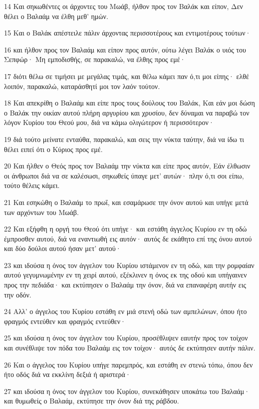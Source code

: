 \par 14 Και σηκωθέντες οι άρχοντες του Μωάβ, ήλθον προς τον Βαλάκ και είπον, Δεν θέλει ο Βαλαάμ να έλθη μεθ' ημών.
\par 15 Και ο Βαλάκ απέστειλε πάλιν άρχοντας περισσοτέρους και εντιμοτέρους τούτων·
\par 16 και ήλθον προς τον Βαλαάμ και είπον προς αυτόν, ούτω λέγει Βαλάκ ο υιός του Σεπφώρ· Μη εμποδισθής, σε παρακαλώ, να έλθης προς εμέ·
\par 17 διότι θέλω σε τιμήσει με μεγάλας τιμάς, και θέλω κάμει παν ό,τι μοι είπης· ελθέ λοιπόν, παρακαλώ, καταράσθητί μοι τον λαόν τούτον.
\par 18 Και απεκρίθη ο Βαλαάμ και είπε προς τους δούλους του Βαλάκ, Και εάν μοι δώση ο Βαλάκ την οικίαν αυτού πλήρη αργυρίου και χρυσίου, δεν δύναμαι να παραβώ τον λόγον Κυρίου του Θεού μου, διά να κάμω ολιγώτερον ή περισσότερον·
\par 19 διά τούτο μείνατε ενταύθα, παρακαλώ, και σεις την νύκτα ταύτην, διά να ίδω τι θέλει ειπεί ότι ο Κύριος προς εμέ.
\par 20 Και ήλθεν ο Θεός προς τον Βαλαάμ την νύκτα και είπε προς αυτόν, Εάν έλθωσιν οι άνθρωποι διά να σε καλέσωσι, σηκωθείς ύπαγε μετ' αυτών· πλην ό,τι σοι είπω, τούτο θέλεις κάμει.
\par 21 Και εσηκώθη ο Βαλαάμ το πρωΐ, και εσαμάρωσε την όνον αυτού και υπήγε μετά των αρχόντων του Μωάβ.
\par 22 Και εξήφθη η οργή του Θεού ότι υπήγε· και εστάθη άγγελος Κυρίου εν τη οδώ έμπροσθεν αυτού, διά να εναντιωθή εις αυτόν· αυτός δε εκάθητο επί της όνου αυτού και δύο δούλοι αυτού ήσαν μετ' αυτού·
\par 23 και ιδούσα η όνος τον άγγελον του Κυρίου ιστάμενον εν τη οδώ, και την ρομφαίαν αυτού γεγυμνωμένην εν τη χειρί αυτού, εξέκλινεν η όνος εκ της οδού και υπήγαινεν προς την πεδιάδα· και εκτύπησεν ο Βαλαάμ την όνον, διά να επαναφέρη αυτήν εις την οδόν.
\par 24 Αλλ' ο άγγελος του Κυρίου εστάθη εν μιά στενή οδώ των αμπελώνων, όπου ήτο φραγμός εντεύθεν και φραγμός εντεύθεν·
\par 25 και ιδούσα η όνος τον άγγελον του Κυρίου, προσέθλιψεν εαυτήν προς τον τοίχον και συνέθλιψε τον πόδα του Βαλαάμ εις τον τοίχον· αυτός δε εκτύπησεν αυτήν πάλιν.
\par 26 Και ο άγγελος του Κυρίου υπήγε παρεμπρός, και εστάθη εν στενώ τόπω, όπου δεν ήτο οδός διά να εκκλίνη δεξιά ή αριστερά·
\par 27 και ιδούσα η όνος τον άγγελον του Κυρίου, συνεκάθησεν υποκάτω του Βαλαάμ· και θυμωθείς ο Βαλαάμ, εκτύπησε την όνον διά της ράβδου.
